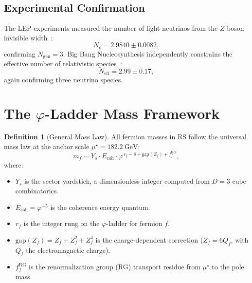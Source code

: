 \documentclass[12pt,a4paper]{article}
\theoremstyle{definition}
\newtheorem{definition}[theorem]{Definition}
\theoremstyle{remark}
\begin{document}
\subsection{Experimental Confirmation}

The LEP experiments measured the number of light neutrinos
from the $Z$ boson invisible width~\cite{LEP}:
\begin{equation}
  N_\nu = 2.9840 \pm 0.0082,
\end{equation}
confirming $N_{\mathrm{gen}} = 3$.  Big Bang Nucleosynthesis
independently constrains the effective number of relativistic
species~\cite{Planck2018}:
\begin{equation}
  N_{\mathrm{eff}} = 2.99 \pm 0.17,
\end{equation}
again confirming three neutrino species.

\section{The $\varphi$-Ladder Mass Framework}
\label{sec:mass-framework}

\begin{definition}[General Mass Law]
\label{def:mass-law}
All fermion masses in RS follow the universal mass law at
the anchor scale $\mu^\star = 182.2~\mathrm{GeV}$:
\begin{equation}
  m_f = Y_s \cdot E_{\mathrm{coh}} \cdot
  \varphi^{\,r_f - 8 + \mathrm{gap}(Z_f) + f^{\mathrm{RG}}_f},
  \label{eq:mass-law}
\end{equation}
where:
\begin{itemize}
  \item $Y_s$ is the sector yardstick, a
  dimensionless integer computed from $D = 3$ cube combinatorics.
  \item $E_{\mathrm{coh}} = \varphi^{-5}$ is the coherence
  energy quantum.
  \item $r_f$ is the integer rung on the $\varphi$-ladder for
  fermion $f$.
  \item $\mathrm{gap}(Z_f) = Z_f + Z_f^2 + Z_f^4$ is the
  charge-dependent correction ($Z_f = 6Q_f$, with $Q_f$ the
  electromagnetic charge).
  \item $f^{\mathrm{RG}}_f$ is the renormalization group (RG)
  transport residue from $\mu^\star$ to the pole mass.
\end{itemize}
\end{definition}
\end{document}
